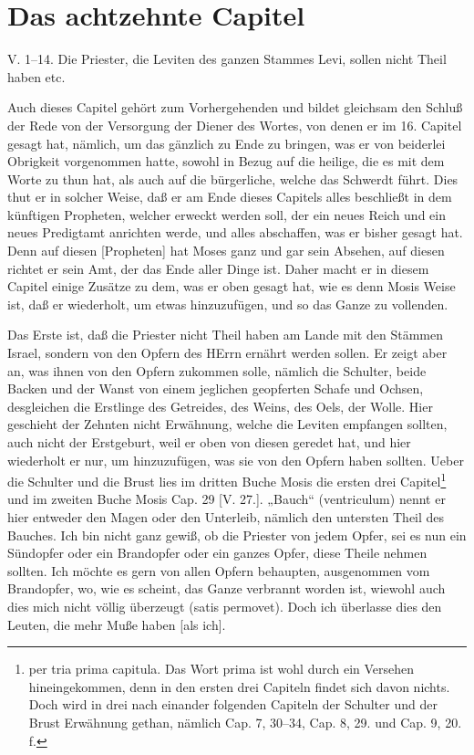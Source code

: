 \section{Das achtzehnte Capitel}

\begin{schriftzitat}
V. 1–14. Die Priester, die Leviten des ganzen Stammes Levi, sollen nicht Theil haben etc.
\end{schriftzitat}

Auch dieses Capitel gehört zum Vorhergehenden und bildet gleichsam den Schluß der Rede von der Versorgung der Diener des Wortes, von denen er im 16. Capitel gesagt hat, nämlich, um das gänzlich zu Ende zu bringen, was er von beiderlei Obrigkeit vorgenommen hatte, sowohl in Bezug auf die heilige, die es mit dem Worte zu thun hat, als auch auf die bürgerliche, welche das Schwerdt führt. Dies thut er in solcher Weise, daß er am Ende dieses Capitels alles beschließt in dem künftigen Propheten, welcher erweckt werden soll, der ein neues Reich und ein neues Predigtamt anrichten werde, und alles abschaffen, was er bisher gesagt hat. Denn auf diesen [Propheten] hat Moses ganz und gar sein Absehen, auf diesen richtet er sein Amt, der das Ende aller Dinge ist. Daher macht er in diesem Capitel einige Zusätze zu dem, was er oben gesagt hat, wie es denn Mosis Weise ist, daß er wiederholt, um etwas hinzuzufügen, und so das Ganze zu vollenden.

Das Erste ist, daß die Priester nicht Theil haben am Lande mit den Stämmen Israel, sondern von den Opfern des HErrn ernährt werden sollen. Er zeigt aber an, was ihnen von den Opfern zukommen solle, nämlich die Schulter, beide Backen und der Wanst von einem jeglichen geopferten Schafe und Ochsen, desgleichen die Erstlinge des Getreides, des Weins, des Oels, der Wolle. Hier geschieht der Zehnten nicht Erwähnung, welche die Leviten empfangen sollten, auch nicht der Erstgeburt, weil
er oben von diesen geredet hat, und hier wiederholt er nur, um hinzuzufügen, was sie von den Opfern haben sollten. Ueber die Schulter und die Brust lies im dritten Buche Mosis die ersten drei Capitel\footnote{per tria prima capitula. Das Wort prima ist wohl durch ein Versehen hineingekommen, denn in den ersten drei Capiteln findet sich davon nichts. Doch wird in drei nach einander folgenden Capiteln der Schulter und der Brust Erwähnung gethan, nämlich Cap. 7, 30–34, Cap. 8, 29. und Cap. 9, 20. f.} und im zweiten Buche Mosis Cap. 29 [V. 27.]. „Bauch“ (ventriculum) nennt er hier entweder den Magen oder den Unterleib, nämlich den untersten Theil des Bauches. Ich bin nicht ganz gewiß, ob die Priester von jedem Opfer, sei es nun ein Sündopfer oder ein Brandopfer oder ein ganzes Opfer, diese Theile nehmen sollten. Ich möchte es gern von allen Opfern behaupten, ausgenommen vom Brandopfer, wo, wie es scheint, das Ganze verbrannt worden ist, wiewohl auch dies mich nicht völlig überzeugt (satis permovet). Doch ich überlasse dies den Leuten, die mehr Muße haben [als ich].

